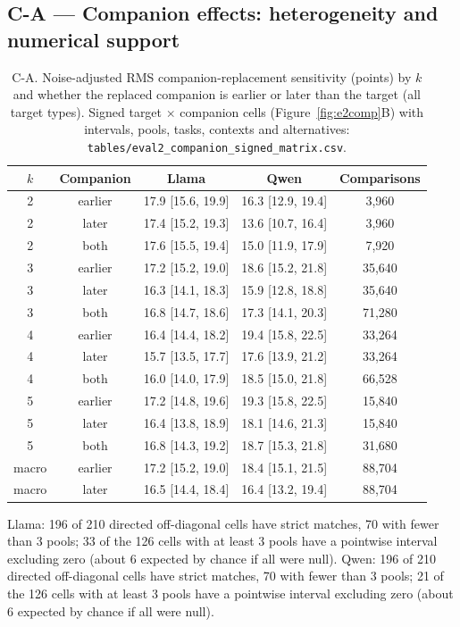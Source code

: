 \documentclass{article}
\begin{document}
\subsection*{C-A --- Companion effects: heterogeneity and numerical support}
\begin{table}[h]
\centering\scriptsize
\caption{C-A. Noise-adjusted RMS companion-replacement sensitivity (points) by $k$ and whether the replaced companion is earlier or later than the target (all target types). Signed target $\times$ companion cells (Figure~\ref{fig:e2comp}B) with intervals, pools, tasks, contexts and alternatives: \texttt{tables/eval2\_companion\_signed\_matrix.csv}.}
\label{tab:CA}
\begin{tabular}{ccccc}
\toprule
$k$ & Companion & Llama & Qwen & Comparisons \\
\midrule
2 & earlier & 17.9 [15.6, 19.9] & 16.3 [12.9, 19.4] & 3,960 \\
2 & later & 17.4 [15.2, 19.3] & 13.6 [10.7, 16.4] & 3,960 \\
2 & both & 17.6 [15.5, 19.4] & 15.0 [11.9, 17.9] & 7,920 \\
3 & earlier & 17.2 [15.2, 19.0] & 18.6 [15.2, 21.8] & 35,640 \\
3 & later & 16.3 [14.1, 18.3] & 15.9 [12.8, 18.8] & 35,640 \\
3 & both & 16.8 [14.7, 18.6] & 17.3 [14.1, 20.3] & 71,280 \\
4 & earlier & 16.4 [14.4, 18.2] & 19.4 [15.8, 22.5] & 33,264 \\
4 & later & 15.7 [13.5, 17.7] & 17.6 [13.9, 21.2] & 33,264 \\
4 & both & 16.0 [14.0, 17.9] & 18.5 [15.0, 21.8] & 66,528 \\
5 & earlier & 17.2 [14.8, 19.6] & 19.3 [15.8, 22.5] & 15,840 \\
5 & later & 16.4 [13.8, 18.9] & 18.1 [14.6, 21.3] & 15,840 \\
5 & both & 16.8 [14.3, 19.2] & 18.7 [15.3, 21.8] & 31,680 \\
macro & earlier & 17.2 [15.2, 19.0] & 18.4 [15.1, 21.5] & 88,704 \\
macro & later & 16.5 [14.4, 18.4] & 16.4 [13.2, 19.4] & 88,704 \\
\bottomrule
\end{tabular}
\end{table}

Llama: 196 of 210 directed off-diagonal cells have strict matches, 70 with fewer than 3 pools; 33 of the 126 cells with at least 3 pools have a pointwise interval excluding zero (about 6 expected by chance if all were null). Qwen: 196 of 210 directed off-diagonal cells have strict matches, 70 with fewer than 3 pools; 21 of the 126 cells with at least 3 pools have a pointwise interval excluding zero (about 6 expected by chance if all were null).
\end{document}
